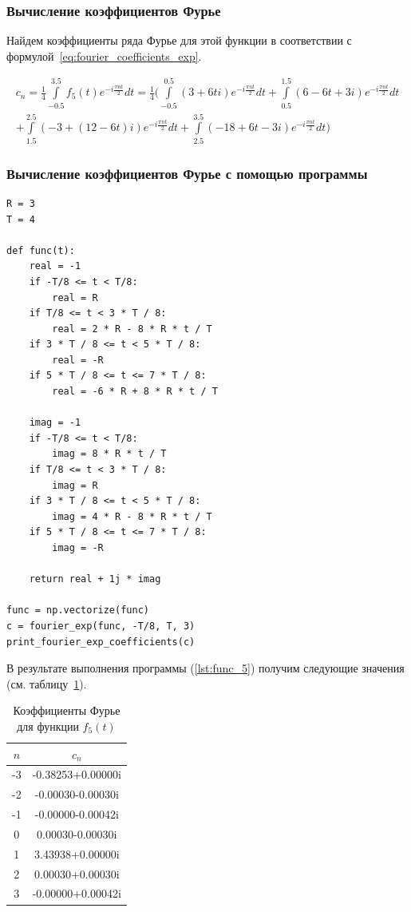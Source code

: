 \subsubsection{Вычисление коэффициентов Фурье}
Найдем коэффициенты ряда Фурье для этой функции в соответствии с формулой~\ref{eq:fourier_coefficients_exp}.

\begin{multline}
    c_n = \frac{1}{4}\int\limits_{-0.5}^{3.5} f_5(t) e^{-i \frac{\pi nt}{2}} dt = \frac{1}{4} ( \int\limits_{-0.5}^{0.5} (3 + 6ti)e^{-i \frac{\pi nt}{2}} dt + \int\limits_{0.5}^{1.5} (6 - 6t + 3i)e^{-i \frac{\pi nt}{2}} dt \\
    + \int\limits_{1.5}^{2.5}(-3 + (12 - 6t)i) e^{-i \frac{\pi nt}{2}} dt + \int\limits_{2.5}^{3.5}(-18 + 6t - 3i) e^{-i \frac{\pi nt}{2}} dt ) 
\end{multline}

\subsubsection{Вычисление коэффициентов Фурье с помощью программы}

\begin{lstlisting}[style=python_white, caption=Вычисление коэффициентов Фурье, label=lst:func_5]
R = 3
T = 4

def func(t):
    real = -1
    if -T/8 <= t < T/8:
        real = R
    if T/8 <= t < 3 * T / 8:
        real = 2 * R - 8 * R * t / T 
    if 3 * T / 8 <= t < 5 * T / 8:
        real = -R
    if 5 * T / 8 <= t <= 7 * T / 8:
        real = -6 * R + 8 * R * t / T

    imag = -1
    if -T/8 <= t < T/8:
        imag = 8 * R * t / T
    if T/8 <= t < 3 * T / 8:
        imag = R
    if 3 * T / 8 <= t < 5 * T / 8:
        imag = 4 * R - 8 * R * t / T
    if 5 * T / 8 <= t <= 7 * T / 8:
        imag = -R

    return real + 1j * imag

func = np.vectorize(func)
c = fourier_exp(func, -T/8, T, 3)
print_fourier_exp_coefficients(c)
\end{lstlisting}

В результате выполнения программы (\ref{lst:func_5}) получим следующие значения (см. таблицу~\ref{tab:func_5_exp}).

\begin{table}[h!]
    \centering
    \begin{tabular}{|c|c|}
        \hline
        $n$ & $c_n$ \\
        \hline
        -3 & -0.38253+0.00000i \\
        -2 & -0.00030-0.00030i \\
        -1 & -0.00000-0.00042i \\
        0 & 0.00030-0.00030i \\
        1 & 3.43938+0.00000i \\
        2 & 0.00030+0.00030i \\
        3 & -0.00000+0.00042i \\
        \hline
    \end{tabular}
    \caption{Коэффициенты Фурье для функции $f_5(t)$ }
    \label{tab:func_5_exp}
\end{table}

